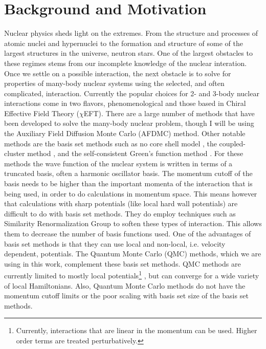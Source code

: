 \section{Background and Motivation}
Nuclear physics sheds light on the extremes. From the structure and processes of atomic nuclei and hypernuclei to the formation and structure of some of the largest structures in the universe, neutron stars. One of the largest obstacles to these regimes stems from our incomplete knowledge of the nuclear interation. Once we settle on a possible interaction, the next obstacle is to solve for properties of many-body nuclear systems using the selected, and often complicated, interaction. Currently the popular choices for 2- and 3-body nuclear interactions come in two flavors, phenomenological and those based in Chiral Effective Field Theory ($\chi$EFT). There are a large number of methods that have been developed to solve the many-body nuclear problem, though I will be using the Auxiliary Field Diffusion Monte Carlo (AFDMC) method. Other notable methods are the basis set methods such as no core shell model \cite{navratil2009,barrett2013}, the coupled-cluster method \cite{hagen2014}, and the self-consistent Green's function method \cite{dickhoff2004,soma2014}. For these methods the wave function of the nuclear system is written in terms of a truncated basis, often a harmonic oscillator basis. The momentum cutoff of the basis needs to be higher than the important momenta of the interaction that is being used, in order to do calculations in momentum space. This means however that calculations with sharp potentials (like local hard wall potentials) are difficult to do with basis set methods. They do employ techniques such as Similarity Renormalization Group \cite{hergert2016} to soften these types of interaction. This allows them to decrease the number of basis functions used. One of the advantages of basis set methods is that they can use local and non-local, i.e. velocity dependent, potentials. The Quantum Monte Carlo (QMC) methods, which we are using in this work, complement these basis set methods. QMC methods are currently limited to mostly local potentials\footnote{Currently, interactions that are linear in the momentum can be used. Higher order terms are treated perturbatively.} \cite{lynn2012}, but can converge for a wide variety of local Hamiltonians. Also, Quantum Monte Carlo methods do not have the momentum cutoff limits or the poor scaling with basis set size of the basis set methods. 

